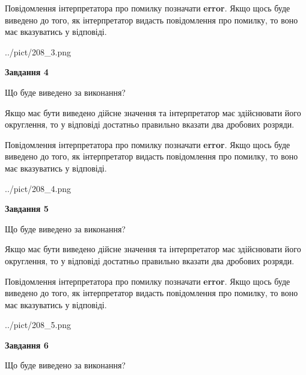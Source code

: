 \documentclass[12pt, ukrainian]{article}
\begin{document}
{\begin {Large}
Повідомлення інтерпретатора про помилку позначати \textbf{error}.
Якщо щось буде виведено до того, як інтерпретатор видасть повідомлення про помилку, 
то воно має вказуватись у відповіді. \par

\begin{center}
	{../pict/208_3.png}
\end{center}
\newpage

{\begin {center}\textbf{Завдання 4}\end {center}}\par
Що буде виведено за виконання? \par

Якщо має бути виведено дійсне значення та інтерпретатор має здійснювати його округлення, 
то у відповіді достатньо правильно вказати два дробових розряди.

Повідомлення інтерпретатора про помилку позначати \textbf{error}.
Якщо щось буде виведено до того, як інтерпретатор видасть повідомлення про помилку, 
то воно має вказуватись у відповіді. \par

\begin{center}
	{../pict/208_4.png}
\end{center}
\newpage

{\begin {center}\textbf{Завдання 5}\end {center}}\par
Що буде виведено за виконання? \par

Якщо має бути виведено дійсне значення та інтерпретатор має здійснювати його округлення, 
то у відповіді достатньо правильно вказати два дробових розряди.

Повідомлення інтерпретатора про помилку позначати \textbf{error}.
Якщо щось буде виведено до того, як інтерпретатор видасть повідомлення про помилку, 
то воно має вказуватись у відповіді. \par

\begin{center}
	{../pict/208_5.png}
\end{center}
\newpage

{\begin {center}\textbf{Завдання 6}\end {center}}\par
Що буде виведено за виконання? \par


\end{Large}}
\end{document}
